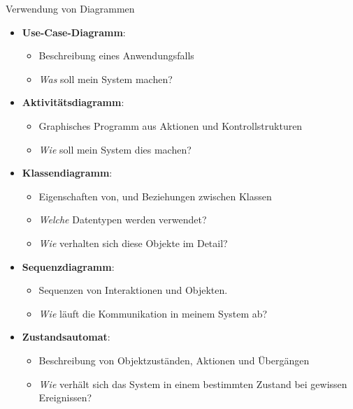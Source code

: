 \begin{bonus}{Verwendung von Diagrammen}
    \begin{itemize}
        \item \textbf{Use-Case-Diagramm}:
              \begin{itemize}
                  \item Beschreibung eines Anwendungsfalls
                  \item \emph{Was} soll mein System machen?
              \end{itemize}
        \item \textbf{Aktivitätsdiagramm}:
              \begin{itemize}
                  \item Graphisches Programm aus Aktionen und Kontrollstrukturen
                  \item \emph{Wie} soll mein System dies machen?
              \end{itemize}
        \item \textbf{Klassendiagramm}:
              \begin{itemize}
                  \item Eigenschaften von, und Beziehungen zwischen Klassen
                  \item \emph{Welche} Datentypen werden verwendet?
                  \item \emph{Wie} verhalten sich diese Objekte im Detail?
              \end{itemize}
        \item \textbf{Sequenzdiagramm}:
              \begin{itemize}
                  \item Sequenzen von Interaktionen und Objekten.
                  \item \emph{Wie} läuft die Kommunikation in meinem System ab?
              \end{itemize}
        \item \textbf{Zustandsautomat}:
              \begin{itemize}
                  \item Beschreibung von Objektzuständen, Aktionen und Übergängen
                  \item \emph{Wie} verhält sich das System in einem bestimmten Zustand bei gewissen Ereignissen?
              \end{itemize}
    \end{itemize}


\end{bonus}
